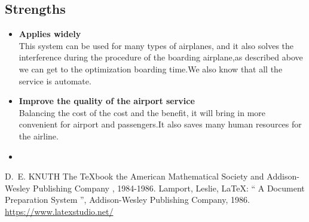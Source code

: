 \documentclass{mcmthesis}
\begin{document}
\subsection{Strengths}
\begin{itemize}
	\item \textbf{Applies widely}\\
	      This  system can be used for many types of airplanes, and it also
	      solves the interference during  the procedure of the boarding
	      airplane,as described above we can get to the  optimization
	      boarding time.We also know that all the service is automate.
	\item \textbf{Improve the quality of the airport service}\\
	      Balancing the cost of the cost and the benefit, it will bring in
	      more convenient  for airport and passengers.It also saves many
	      human resources for the airline. \item \textbf{}
\end{itemize}

\begin{thebibliography}{99}
	 D.~E. KNUTH   The \TeX{}book  the American
	Mathematical Society and Addison-Wesley
	Publishing Company , 1984-1986.
	Lamport, Leslie,  \LaTeX{}: `` A Document Preparation System '',
	Addison-Wesley Publishing Company, 1986.
	\url{https://www.latexstudio.net/}
\end{thebibliography}
\end{document}
